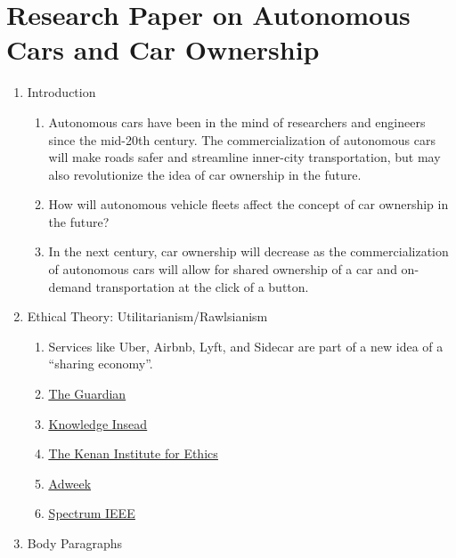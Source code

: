 \documentclass[letterpaper, 12pt]{article}
\begin{document}
\section*{Research Paper on Autonomous Cars and Car Ownership}
\begin{enumerate}
  \item Introduction
  \begin{enumerate}
    \item Autonomous cars have been in the mind of researchers and engineers
      since the mid-20th century. The commercialization of autonomous cars will
      make roads safer and streamline inner-city transportation, but may also
      revolutionize the idea of car ownership in the future.
    \item How will autonomous vehicle fleets affect the concept of car ownership
      in the future?
    \item In the next century, car ownership will decrease as the
      commercialization of autonomous cars will allow for shared ownership of
      a car and on-demand transportation at the click of a button.
  \end{enumerate}
  \item Ethical Theory: Utilitarianism/Rawlsianism
  \begin{enumerate}
    \item Services like Uber, Airbnb, Lyft, and Sidecar are part of a new idea
      of a ``sharing economy''.
    \item \href{https://www.theguardian.com/technology/2016/oct/17/sharing-economy-capitalism-uber-airbnb-ownership}{\underline{The Guardian}}
    \item \href{http://knowledge.insead.edu/responsibility/whos-responsible-the-ethics-of-the-sharing-economy-5034}{\underline{Knowledge Insead}}
    \item \href{https://kenan.ethics.duke.edu/wp-content/uploads/2012/08/Sharing-EconomyTN2015.pdf}{\underline{The Kenan Institute for Ethics}}
    \item \href{http://www.adweek.com/digital/sharing-economy-steeped-ethical-controversy/}{\underline{Adweek}}
    \item \href{http://spectrum.ieee.org/cars-that-think/transportation/self-driving/people-want-driverless-cars-with-utilitarian-ethics-unless-theyre-a-passenger}{\underline{Spectrum IEEE}}
  \end{enumerate}
  \item Body Paragraphs
  \begin{enumerate}

\end{enumerate}
\end{enumerate}
\end{document}

